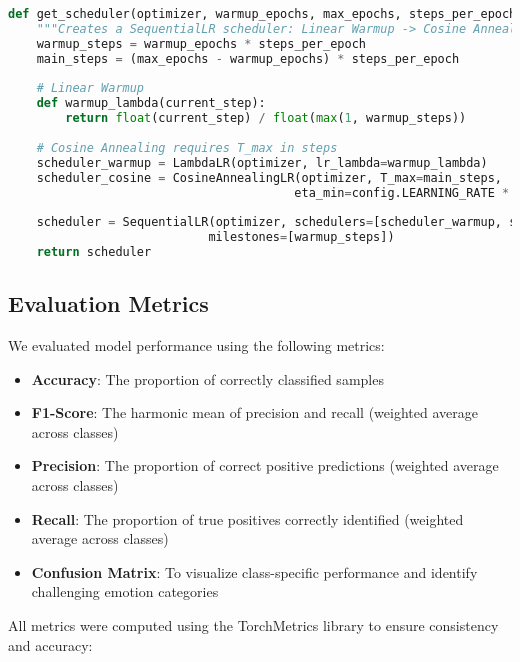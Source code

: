 \begin{lstlisting}[language=Python, caption=Learning Rate Scheduler Implementation]
def get_scheduler(optimizer, warmup_epochs, max_epochs, steps_per_epoch):
    """Creates a SequentialLR scheduler: Linear Warmup -> Cosine Annealing."""
    warmup_steps = warmup_epochs * steps_per_epoch
    main_steps = (max_epochs - warmup_epochs) * steps_per_epoch
    
    # Linear Warmup
    def warmup_lambda(current_step):
        return float(current_step) / float(max(1, warmup_steps))
    
    # Cosine Annealing requires T_max in steps
    scheduler_warmup = LambdaLR(optimizer, lr_lambda=warmup_lambda)
    scheduler_cosine = CosineAnnealingLR(optimizer, T_max=main_steps, 
                                        eta_min=config.LEARNING_RATE * config.MIN_LR_FACTOR)
    
    scheduler = SequentialLR(optimizer, schedulers=[scheduler_warmup, scheduler_cosine], 
                            milestones=[warmup_steps])
    return scheduler
\end{lstlisting}

\subsection{Evaluation Metrics}

We evaluated model performance using the following metrics:
\begin{itemize}
    \item \textbf{Accuracy}: The proportion of correctly classified samples
    \item \textbf{F1-Score}: The harmonic mean of precision and recall (weighted average across classes)
    \item \textbf{Precision}: The proportion of correct positive predictions (weighted average across classes)
    \item \textbf{Recall}: The proportion of true positives correctly identified (weighted average across classes)
    \item \textbf{Confusion Matrix}: To visualize class-specific performance and identify challenging emotion categories
\end{itemize}

All metrics were computed using the TorchMetrics library to ensure consistency and accuracy:

